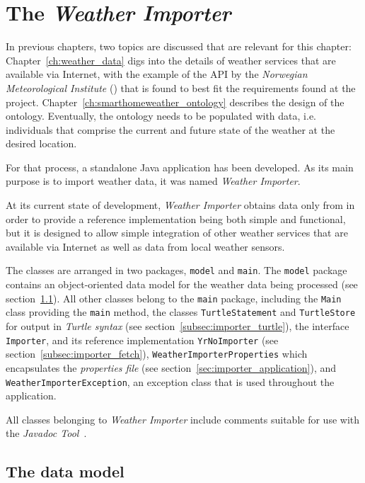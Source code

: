 \chapter{The \emph{Weather Importer}}
\label{ch:weather_importer}

In previous chapters, two topics are discussed that are relevant for this chapter: Chapter~\ref{ch:weather_data} digs into the details of weather services that are available via Internet, with the example of the API by the \emph{Norwegian Meteorological Institute} (\yrno) that is found to best fit the requirements found at the \smarthomeweather project. Chapter~\ref{ch:smarthomeweather_ontology} describes the design of the \smarthomeweather ontology. Eventually, the ontology needs to be populated with data, i.e. individuals that comprise the current and future state of the weather at the desired location.

For that process, a standalone Java application has been developed. As its main purpose is to import weather data, it was named \emph{Weather Importer}.

At its current state of development, \emph{Weather Importer} obtains data only from \yrno in order to provide a reference implementation being both simple and functional, but it is designed to allow simple integration of other weather services that are available via Internet as well as data from local weather sensors.

The classes are arranged in two packages, \texttt{model} and \texttt{main}. The \texttt{model} package contains an object-oriented data model for the weather data being processed (see section~\ref{sec:importer_model}). All other classes belong to the \texttt{main} package, including the \texttt{Main} class providing the \texttt{main} method, the classes \texttt{TurtleStatement} and \texttt{TurtleStore} for output in \emph{Turtle syntax}\cite{Turtle} (see section~\ref{subsec:importer_turtle}), the interface \texttt{Importer}, and its reference implementation \texttt{YrNoImporter} (see section~\ref{subsec:importer_fetch}), \texttt{WeatherImporterProperties} which encapsulates the \emph{properties file} (see section~\ref{sec:importer_application}), and \texttt{WeatherImporterException}, an exception class that is used throughout the application.

All classes belonging to \emph{Weather Importer} include comments suitable for use with the \emph{Javadoc Tool}~\cite{javadoc}.

\section{The data model}
\label{sec:importer_model}

